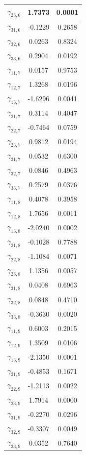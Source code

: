 \documentclass[a4paper, 12pt, openany, oneside, brazil]{abntex2}
\begin{document}
\begin{apendicesenv}
\begin{longtable}{|c|c|c|}
	$\gamma_{23,6}$ & 1.7373 & 0.0001 \\
	\hline
	$\gamma_{31,6}$ & -0.1229 & 0.2658 \\
	\hline
	$\gamma_{32,6}$ & 0.0263 & 0.8324 \\
	\hline
	$\gamma_{33,6}$ & 0.2904 & 0.0192 \\
	\hline
	$\gamma_{11,7}$ & 0.0157 & 0.9753 \\
	\hline
	$\gamma_{12,7}$ & 1.3268 & 0.0196 \\
	\hline
	$\gamma_{13,7}$ & -1.6296 & 0.0041 \\
	\hline
	$\gamma_{21,7}$ & 0.3114 & 0.4047 \\
	\hline
	$\gamma_{22,7}$ & -0.7464 & 0.0759 \\
	\hline
	$\gamma_{23,7}$ & 0.9812 & 0.0194 \\
	\hline
	$\gamma_{31,7}$ & 0.0532 & 0.6300 \\
	\hline
	$\gamma_{32,7}$ & 0.0846 & 0.4963 \\
	\hline
	$\gamma_{33,7}$ & 0.2579 & 0.0376 \\
	\hline
	$\gamma_{11,8}$ & 0.4078 & 0.3958 \\
	\hline
	$\gamma_{12,8}$ & 1.7656 & 0.0011 \\
	\hline
	$\gamma_{13,8}$ & -2.0240 & 0.0002 \\
	\hline
	$\gamma_{21,8}$ & -0.1028 & 0.7788 \\
	\hline
	$\gamma_{22,8}$ & -1.1084 & 0.0071 \\
	\hline
	$\gamma_{23,8}$ & 1.1356 & 0.0057 \\
	\hline
	$\gamma_{31,8}$ & 0.0408 & 0.6963 \\
	\hline
	$\gamma_{32,8}$ & 0.0848 & 0.4710 \\
	\hline
	$\gamma_{33,8}$ & -0.3630 & 0.0020 \\
	\hline
	$\gamma_{11,9}$ & 0.6003 & 0.2015 \\
	\hline
	$\gamma_{12,9}$ & 1.3509 & 0.0106 \\
	\hline
	$\gamma_{13,9}$ & -2.1350 & 0.0001 \\
	\hline
	$\gamma_{21,9}$ & -0.4853 & 0.1671 \\
	\hline
	$\gamma_{22,9}$ & -1.2113 & 0.0022 \\
	\hline
	$\gamma_{23,9}$ & 1.7914 & 0.0000 \\
	\hline
	$\gamma_{31,9}$ & -0.2270 & 0.0296 \\
	\hline
	$\gamma_{32,9}$ & -0.3307 & 0.0049 \\
	\hline
	$\gamma_{33,9}$ & 0.0352 & 0.7640 \\

\end{longtable}
\end{apendicesenv}
\end{document}
